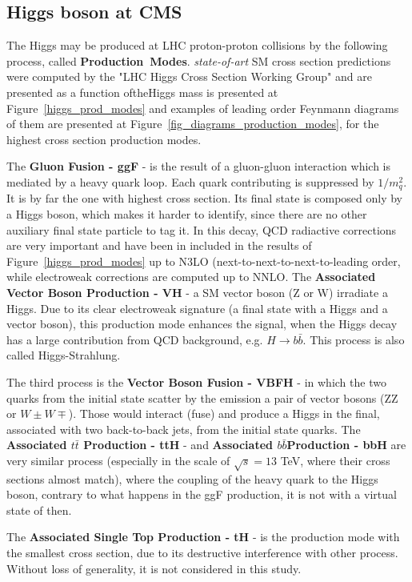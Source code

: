 \subsection{Higgs boson at CMS}
\label{section_sm_vb_results}

The Higgs may be produced at LHC proton-proton collisions by the following process, called \mbox{\textbf{Production Modes}}. \textit{state-of-art} SM cross section predictions were computed by the "LHC Higgs Cross Section Working Group"\cite{deFlorian:2016spz} and are presented as a function oftheHiggs mass is presented at Figure~\ref{higgs_prod_modes} and examples of leading order Feynmann diagrams of them are presented at Figure~\ref{fig_diagrams_production_modes}, for the highest cross section production modes.

The \textbf{Gluon Fusion - ggF} - is the result of a gluon-gluon interaction which is mediated by a heavy quark loop. Each quark contributing is suppressed by $1/m_{q}^{2}$. It is by far the one with highest cross section. Its final state is composed only by a Higgs boson, which makes it harder to identify, since there are no other auxiliary final state particle to tag it. In this decay, QCD radiactive corrections are very important and have been in included in the results of Figure~\ref{higgs_prod_modes} up to N3LO (next-to-next-to-next-to-leading order, while electroweak corrections are computed up to NNLO. The \textbf{Associated Vector Boson Production - VH} - a SM vector boson (Z or W) irradiate a Higgs. Due to its clear electroweak signature (a final state with a Higgs and a vector boson), this production mode enhances the signal, when the Higgs decay has a large contribution from QCD background, e.g. $H \rightarrow b\bar{b}$. This process is also called Higgs-Strahlung.

The third process is the \textbf{Vector Boson Fusion - VBFH} - in which the two quarks from the initial state scatter by the emission a pair of vector bosons (ZZ or $W{\pm}W{\mp}$). Those would interact (fuse) and produce a Higgs in the final, associated with two back-to-back jets, from the initial state quarks. The \textbf{Associated $t\bar{t}$ Production - ttH} - and \textbf{Associated $b\bar{b}$Production - bbH} are very similar process (especially in the scale of $\sqrt{s} = 13$ TeV, where their cross sections almost match), where the coupling of the heavy quark to the Higgs boson, contrary to what happens in the ggF production, it is not with a virtual state of then. 

The \textbf{Associated Single Top Production - tH} - is the production mode with the smallest cross section, due to its destructive interference with other process. Without loss of generality, it is not considered in this study.


